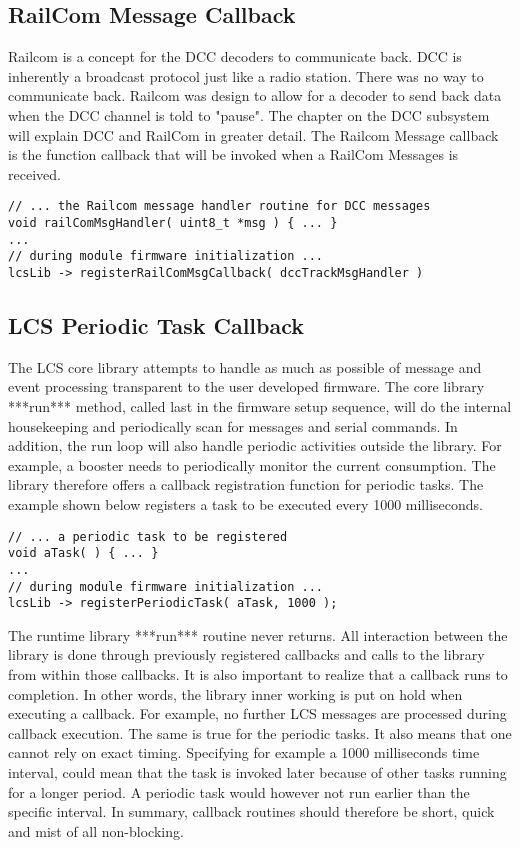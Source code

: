 \subsection{RailCom Message Callback}

Railcom is a concept for the DCC decoders to communicate back. DCC is inherently a broadcast protocol just like a radio station. There was no way to communicate back.  Railcom was design to allow for a decoder to send back data when the DCC channel is told to "pause". The chapter on the DCC subsystem will explain DCC and RailCom in greater detail. The Railcom Message callback is the function callback that will be invoked when a RailCom Messages is received.

\lstset{style=codesnippetstyle}
\begin{lstlisting}
// ... the Railcom message handler routine for DCC messages
void railComMsgHandler( uint8_t *msg ) { ... }
...
// during module firmware initialization ...
lcsLib -> registerRailComMsgCallback( dccTrackMsgHandler )
\end{lstlisting}

\subsection{LCS Periodic Task Callback}

The LCS core library attempts to handle as much as possible of message and event processing transparent to the user developed firmware. The core library ***run*** method, called last in the firmware setup sequence, will do the internal housekeeping and periodically scan for messages and serial commands. In addition, the run loop will also handle periodic activities outside the library. For example, a booster needs to periodically monitor the current consumption. The library therefore offers a callback registration function for periodic tasks. The example shown below registers a task to be executed every 1000 milliseconds.

\lstset{style=codesnippetstyle}
\begin{lstlisting}
// ... a periodic task to be registered
void aTask( ) { ... }
...
// during module firmware initialization ...
lcsLib -> registerPeriodicTask( aTask, 1000 );
\end{lstlisting}

The runtime library ***run*** routine never returns. All interaction between the library is done through previously registered callbacks and calls to the library from within those callbacks. It is also important to realize that a callback runs to completion. In other words, the library inner working is put on hold when executing a callback. For example, no further LCS messages are processed during callback execution. The same is true for the periodic tasks. It also means that one cannot rely on exact timing. Specifying for example a 1000 milliseconds time interval, could mean that the task is invoked later because of other tasks running for a longer period. A periodic task would however not run earlier than the specific interval. In summary, callback routines should therefore be short, quick and mist of all non-blocking.

